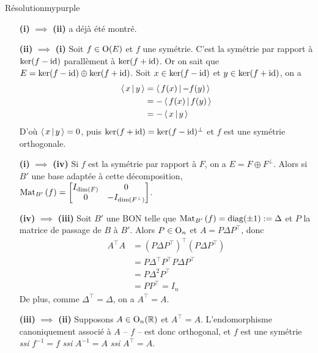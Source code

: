     \begin{demo}{Résolution}{mypurple}
        \begin{itemize}[leftmargin=3cm]
            \item[\textbf{(i)} $\implies$ \textbf{(ii)}] a déjà été montré.
            \item[\textbf{(ii)} $\implies$ \textbf{(i)}] Soit $f \in \operatorname{O}(E)$ et $f$ une symétrie. C’est la symétrie par rapport à $\ker(f - \operatorname{id})$ parallèment à $\ker(f + \operatorname{id})$. Or on sait que $E = \ker(f - \operatorname{id}) \oplus \ker(f + \operatorname{id})$. Soit $x \in \ker(f - \operatorname{id})$ et $y \in \ker(f + \operatorname{id})$, on a 
            \begin{align*}
                \left<\,x\,\middle|\,y\,\right>
                &= \left<\,f(x)\,\middle|\,-f(y)\,\right> \\
                &= - \left<\,f(x)\,\middle|\,f(y)\,\right> \\
                &= - \left<\,x\,\middle|\,y\,\right>
            \end{align*}
            D’où $\left<\,x\,\middle|\,y\,\right> = 0$, puis $\ker(f + \operatorname{id}) = \ker(f - \operatorname{id})^{\perp}$ et $f$ est une symétrie orthogonale.
            \item[\textbf{(i)} $\implies$ \textbf{(iv)}] Si $f$ est la symétrie par rapport à $F$, on a $E = F \oplus F^{\perp}$. Alors si $B'$ une base adaptée à cette décomposition, $\text{Mat}_{B'}\left(f\right) = \begin{bmatrix}
                I_{\dim(F)} & 0 \\
                0 & -I_{\dim(F^{\perp})}
            \end{bmatrix}$.
            \item[\textbf{(iv)} $\implies$ \textbf{(iii)}] Soit $B'$ une BON telle que $\text{Mat}_{B'}\left(f\right) = \operatorname{diag}(\pm 1) := \Delta$ et $P$ la matrice de passage de $B$ à $B'$. Alors $P \in \operatorname{O}_n$ et $A = P \Delta P^{\top}$, donc 
            \begin{align*}
                A^{\top} A 
                &= (P \Delta P^{\top})^{\top}(P \Delta P^{\top}) \\
                &= P \Delta^{\top} P^{\top} P \Delta P^{\top} \\
                &= P \Delta^2 P^{\top} \\
                &= P P^{\top} = I_n
            \end{align*}
            De plus, comme $\Delta^{\top} = \Delta$, on a $A^{\top} = A$.
            \item[\textbf{(iii)} $\implies$ \textbf{(ii)}] Supposons $A \in \operatorname{O}_n(\mathbb{R})$ et $A^{\top} = A$. L’endomorphisme canoniquement associé à $A$ -- $f$ -- est donc orthogonal, et $f$ est une symétrie \textit{ssi} $f^{-1} = f$ \textit{ssi} $A^{-1} = A$ \textit{ssi} $A^{\top} = A$.
        \end{itemize}
    \end{demo}


